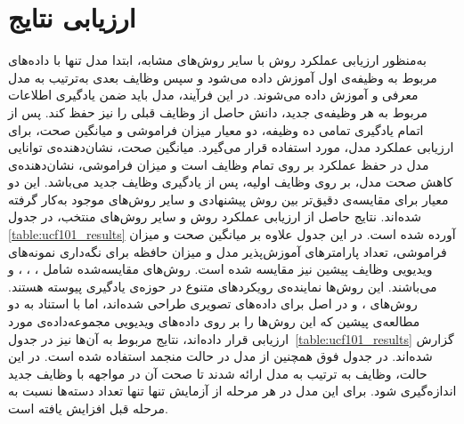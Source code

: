 \section{ارزیابی نتایج}
به‌منظور ارزیابی عملکرد روش 
با سایر روش‌های مشابه، ابتدا مدل تنها با داده‌های مربوط به وظیفه‌ی اول آموزش داده می‌شود و سپس وظایف بعدی به‌ترتیب به مدل معرفی و آموزش داده می‌شوند. در این فرآیند، مدل باید ضمن یادگیری اطلاعات مربوط به هر وظیفه‌ی جدید، دانش حاصل از وظایف قبلی را نیز حفظ کند. پس از اتمام یادگیری تمامی ده وظیفه، دو معیار میزان فراموشی و میانگین صحت، برای ارزیابی عملکرد مدل، مورد استفاده قرار می‌گیرد. میانگین صحت، نشان‌دهنده‌ی توانایی مدل در حفظ عملکرد بر روی تمام وظایف است و میزان فراموشی، نشان‌دهنده‌ی کاهش صحت مدل، بر روی وظایف اولیه، پس از یادگیری وظایف جدید می‌باشد. این دو معیار برای مقایسه‌ی دقیق‌تر بین روش پیشنهادی و سایر روش‌های موجود به‌کار گرفته شده‌اند. 
نتایج حاصل از ارزیابی عملکرد روش  و سایر روش‌های منتخب، در جدول
\ref{table:ucf101_results}
آورده شده است. در این جدول علاوه بر میانگین صحت و میزان فراموشی، تعداد پارامترهای آموزش‌پذیر مدل و میزان حافظه‌ برای نگه‌داری نمونه‌های ویدیویی وظایف پیشین نیز مقایسه شده است.
روش‌های مقایسه‌شده شامل \cite{11}،
 \cite{7}،
  \cite{l2p}،
 \cite{pivot} و \cite{open-vclip} می‌باشند. این روش‌ها نماینده‌ی رویکردهای متنوع در حوزه‌ی یادگیری پیوسته هستند. روش‌های ،  و  در اصل برای داده‌های تصویری طراحی شده‌اند، اما با استناد به دو مطالعه‌ی پیشین \cite{vclimb,rainbowprompt} که این روش‌ها را بر روی داده‌های ویدیویی مجموعه‌داده‌ی  مورد ارزیابی قرار داده‌اند، نتایج مربوط به آن‌ها نیز در
جدول~\ref{table:ucf101_results}
گزارش شده‌اند. در جدول فوق همچنین از مدل  در حالت منجمد استفاده شده است.  در این حالت، وظایف به ترتیب به مدل ارائه شدند تا صحت آن در مواجهه با وظایف جدید اندازه‌گیری شود. برای این مدل در هر مرحله از آزمایش تنها تنها تعداد دسته‌ها نسبت به مرحله قبل افزایش یافته است.
  
